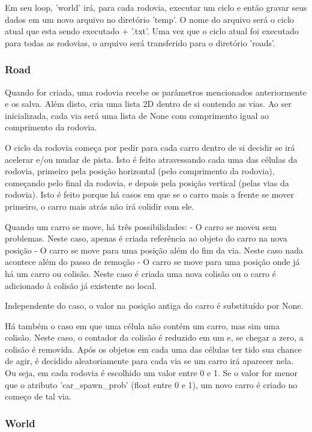 \documentclass{article}
\begin{document}
    Em seu loop, 'world' irá, para cada rodovia, executar um ciclo e então gravar seus dados em um novo arquivo no
    diretório 'temp'. O nome do arquivo será o ciclo atual que esta sendo executado + '.txt'. Uma vez que o ciclo
    atual foi executado para todas as rodovias, o arquivo será transferido para o diretório 'roads'.


    \subsubsection{Road}
    Quando for criada, uma rodovia recebe os parâmetros mencionados anteriormente e os salva. Além disto, cria
    uma lista 2D dentro de si contendo as vias. Ao ser inicializada, cada via será uma lista de None com comprimento
    igual ao comprimento da rodovia.

    O ciclo da rodovia começa por pedir para cada carro dentro de si decidir se irá acelerar e/ou mudar de pista.
    Isto é feito atravessando cada uma das células da rodovia, primeiro pela posição horizontal (pelo comprimento
    da rodovia), começando pelo final da rodovia, e depois pela posição vertical (pelas vias da rodovia). Isto é
    feito porque há casos em que se o carro mais a frente se mover primeiro, o carro mais atrás não irá colidir com
    ele.

    Quando um carro se move, há três possibilidades:
    - O carro se moveu sem problemas. Neste caso, apenas é criada referência ao objeto do carro na nova posição
    - O carro se move para uma posição além do fim da via. Neste caso nada acontece além do passo de remoção
    - O carro se move para uma posição onde já há um carro ou colisão. Neste caso é  criada uma nova colisão ou o
    carro é adicionado à colisão já existente no local.
    
    Independente do caso, o valor na posição antiga do carro é substituído por None.
    
    Há também o caso em que uma célula não contém um carro, mas sim uma colisão. Neste caso, o contador da colisão
    é reduzido em um e, se chegar a zero, a colisão é removida.
    Após os objetos em cada uma das células ter tido sua chance de agir, é decidido aleatoriamente para cada via se
    um carro irá aparecer nela. Ou seja, em cada rodovia é escolhido um valor entre 0 e 1. Se o valor for menor
    que o atributo 'car_spawn_prob' (float entre 0 e 1), um novo carro é criado no começo de tal via.
    

    \subsubsection{World}
\end{document}
